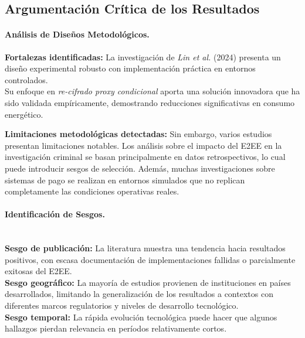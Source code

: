 \documentclass[spanish,12pt,a4paper]{article}
\begin{document}
	\subsection*{Argumentación Crítica de los Resultados}
	\begin{multicols}{2}
	
	\paragraph{Análisis de Diseños Metodológicos.}
	
	\textbf{Fortalezas identificadas:} La investigación de \textit{Lin et al.} (2024) presenta un diseño experimental robusto con implementación práctica en entornos controlados.\\ Su enfoque en \textit{re-cifrado proxy condicional} aporta una solución innovadora que ha sido validada empíricamente, demostrando reducciones significativas en consumo energético.
	
	\textbf{Limitaciones metodológicas detectadas:} Sin embargo, varios estudios presentan limitaciones notables. Los análisis sobre el impacto del E2EE en la investigación criminal se basan principalmente en datos retrospectivos, lo cual puede introducir sesgos de selección. Además, muchas investigaciones sobre sistemas de pago se realizan en entornos simulados que no replican completamente las condiciones operativas reales.
	
	\paragraph{Identificación de Sesgos.}
		\textbf{\\Sesgo de publicación:} La literatura muestra una tendencia hacia resultados positivos, con escasa documentación de implementaciones fallidas o parcialmente exitosas del E2EE.\\
		\textbf{Sesgo geográfico:} La mayoría de estudios provienen de instituciones en países desarrollados, limitando la generalización de los resultados a contextos con diferentes marcos regulatorios y niveles de desarrollo tecnológico.\\
		\textbf{Sesgo temporal:} La rápida evolución tecnológica puede hacer que algunos hallazgos pierdan relevancia en períodos relativamente cortos.

	

\end{multicols}
\end{document}
